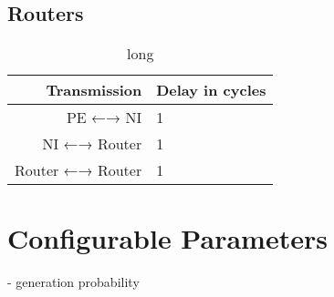 \subsection{Routers}

\begin{table}
    \centering
    \begin{tabulary}{\textwidth}{R|L}
        Transmission & Delay in cycles \\\hline
        PE ←→ NI & 1 \\
        NI ←→ Router & 1 \\
        Router ←→ Router & 1
    \end{tabulary}
    \caption[short]{long}
    \label{tab:transmissionlatencies}
\end{table}

\section{Configurable Parameters}\label{sec:confparams}
- generation probability

